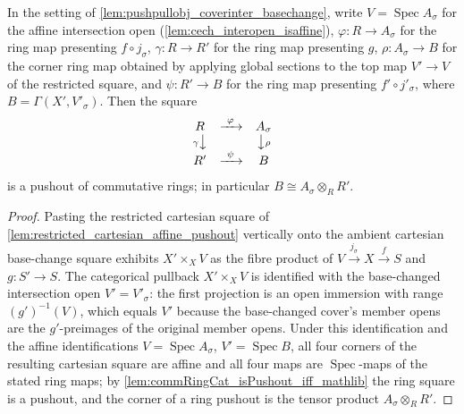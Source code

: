 \begin{lemma}\leanok
  \label{lem:coverinter_ring_pushout}
  In the setting of \cref{lem:pushpullobj_coverinter_basechange}, write
  \(V = \operatorname{Spec} A_\sigma\) for the affine intersection open
  (\cref{lem:cech_interopen_isaffine}), \(\varphi : R \to A_\sigma\) for the ring map
  presenting \(f \circ j_\sigma\), \(\gamma : R \to R'\) for the ring map presenting \(g\),
  \(\rho : A_\sigma \to B\) for the corner ring map obtained by applying global sections to
  the top map \(V' \to V\) of the restricted square, and \(\psi : R' \to B\) for the ring map
  presenting \(f' \circ j'_\sigma\), where \(B = \Gamma(X', V'_\sigma)\). Then the square
  \[
    \begin{array}{ccc}
      R & \xrightarrow{\ \varphi\ } & A_\sigma\\
      {\scriptstyle \gamma}\big\downarrow & & \big\downarrow{\scriptstyle \rho}\\
      R' & \xrightarrow{\ \psi\ } & B
    \end{array}
  \]
  is a pushout of commutative rings; in particular \(B \cong A_\sigma \otimes_R R'\).
\end{lemma}
\begin{proof}
  \leanok
  Pasting the restricted cartesian square of
  \cref{lem:restricted_cartesian_affine_pushout} vertically onto the ambient cartesian
  base-change square exhibits \(X' \times_X V\) as the fibre product of
  \(V \xrightarrow{j_\sigma} X \xrightarrow{f} S\) and \(g : S' \to S\). The categorical
  pullback \(X' \times_X V\) is identified with the base-changed intersection open
  \(V' = V'_\sigma\): the first projection is an open immersion with range
  \((g')^{-1}(V)\), which equals \(V'\) because the base-changed cover's member opens are
  the \(g'\)-preimages of the original member opens. Under this identification and the
  affine identifications \(V = \operatorname{Spec} A_\sigma\),
  \(V' = \operatorname{Spec} B\), all four corners of the resulting cartesian square are
  affine and all four maps are \(\operatorname{Spec}\)-maps of the stated ring maps; by
  \cref{lem:commRingCat_isPushout_iff_mathlib} the ring square is a pushout, and the corner
  of a ring pushout is the tensor product \(A_\sigma \otimes_R R'\).
\end{proof}

